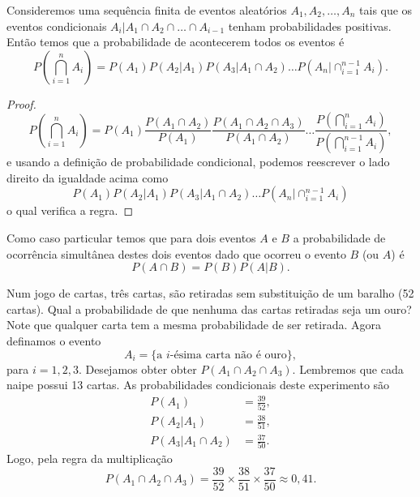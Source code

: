 \begin{frame}
 \begin{teo}
Consideremos uma sequência finita de  eventos aleatórios $A_1, A_2,\ldots, A_n$ tais que os eventos condicionais $ A_i|A_1\cap A_2\cap\ldots\cap A_{i-1} $ tenham probabilidades positivas. Então temos que a probabilidade de acontecerem todos os eventos é 
\[P\left(\bigcap_{i=1}^nA_i\right)=P(A_1)P(A_2|A_1)P(A_3|A_1\cap A_2)\ldots P(A_n|\cap_{i=1}^{n-1}A_i).\] 	
\end{teo}

\begin{proof}\[P\left(\bigcap_{i=1}^nA_i\right)=P(A_1)\frac{P(A_1\cap A_2)}{P(A_1)}\frac{P(A_1\cap A_2\cap A_3)}{P(A_1\cap A_2)}\ldots \frac{P(\bigcap_{i=1}^n A_i)}{P(\bigcap_{i=1}^{n-1} A_i)},\] 	
e usando a definição de probabilidade condicional, podemos reescrever o lado direito da igualdade acima como
\[P(A_1)P(A_2|A_1)P(A_3|A_1\cap A_2)\ldots P(A_n|\cap_{i=1}^{n-1}A_i)\]
o qual verifica a regra. 	
\end{proof}

Como caso particular temos que para  dois eventos $A$ e $B$ a probabilidade de ocorrência simultânea destes dois eventos dado que ocorreu o evento $B$ (ou $A$) é 
\[P(A\cap B)=P(B)P(A|B).\]
\end{frame}

\begin{frame}
 \begin{exem}
Num jogo de cartas, três cartas, são retiradas sem substituição de um baralho (52
cartas). Qual a probabilidade de que nenhuma das cartas retiradas seja um ouro?
Note que qualquer carta tem a mesma probabilidade de ser retirada. Agora definamos  o evento 
$$A_i = \{ \text{a $i$-ésima carta não é ouro}\},$$ para $i = 1, 2, 3$. Desejamos obter 
obter $P(A_1\cap  A_2 \cap A_3)$. Lembremos que cada naipe possui 13 cartas. 
As probabilidades condicionais deste experimento são 
$$
\begin{aligned}
P(A_1) &=\frac{39}{52}, \\
P(A_2 | A_1) &= \frac{38}{51}, \\
P(A_3 | A_1 \cap  A_2) &= \frac{37}{50}.
\end{aligned}
$$
Logo, pela regra da multiplicação
$$P(A_1 \cap A_2 \cap A_3) =\frac{39}{52}\times\frac{38}{51}\times\frac{37}{50} \approx 0,41.$$
\end{exem}

\end{frame}


